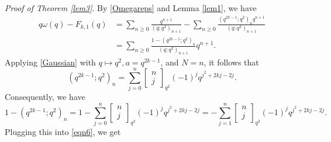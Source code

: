 \documentclass[12pt,reqno]{amsart}
\renewcommand{\(}{\left\(}
\renewcommand{\)}{\right\)}
\numberwithin{equation}{section}
\theoremstyle{plain}
\theoremstyle{definition}
\numberwithin{equation}{section}
\begin{document}
\noindent \emph{Proof of Theorem \ref{lem3}}. By \eqref{Omegareps} and Lemma \ref{lem1}, we have
\begin{align}\label{eqn6}
q\omega(q)-F_{k,1}(q)&=\sum_{n\ge 0}\frac{q^{n+1}}{\left(q;q^2\right)_{n+1}}-\sum_{n\ge 0}\frac{\left(q^{2k-1};q^2\right)_nq^{n+1}}{\left(q;q^2\right)_{n+1}}\nonumber\\
&=\sum_{n\ge 0}\frac{1-\left(q^{2k-1};q^2\right)_n}{\left(q;q^2\right)_{n+1}}q^{n+1}.
\end{align} 
Applying \eqref{Gaussian} with $q\mapsto q^2, a=q^{2k-1}$, and $N=n$, it follows that
\[
\left(q^{2k-1};q^2\right)_n=\sum_{j=0}^{n}\begin{bmatrix}
n\\
j
\end{bmatrix}_{q^2}(-1)^j q^{j^2+2kj-2j}.
\]
Consequently, we have
\[
1-\left(q^{2k-1};q^2\right)_n=1-\sum_{j=0}^{n}\begin{bmatrix}
n\\
j
\end{bmatrix}_{q^2}(-1)^j q^{j^2+2kj-2j}=-\sum_{j=1}^{n}\begin{bmatrix}
n\\
j
\end{bmatrix}_{q^2}(-1)^j q^{j^2+2kj-2j}.
\]
Plugging this into \eqref{eqn6}, we get
\end{document}
